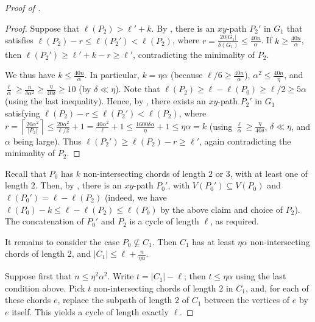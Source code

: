 \documentclass[11pt,english]{article}
\theoremstyle{plain}
\theoremstyle{definition}
\theoremstyle{remark}
\newcommand{\ceil}[1]{
	\left\lceil #1 \right\rceil
}
\begin{document}
\begin{proof}[Proof of ]
			\begin{proof}
				Suppose that $\ell(P_2) > \ell' + k$. 
				By , there is an $xy$-path $P_2'$ in $G_1$ that satisfies $\ell(P_2) - r \le \ell(P_2') < \ell(P_2)$, where $r = \frac{20|G_1|}{\delta(G_1)} \le \frac{40n}{\alpha}$. If $k \ge \frac{40n}{\alpha}$, then $\ell(P_2') \ge \ell' + k - r \ge \ell'$, contradicting the minimality of $P_2$. 

				We thus have $k \le \frac{40n}{\alpha}$. In particular, $k = \eta \alpha$ (because $\ell/6 \ge \frac{40n}{\alpha}$), $\alpha^2 \le \frac{40n}{\eta}$, and $\frac{\ell}{\alpha} \ge \frac{n}{\delta \alpha^2} \ge \frac{\eta}{40\delta} \ge 10$ (by $\delta \ll \eta$).
				Note that $\ell(P_2) \ge \ell - \ell(P_0) \ge \ell/2 \ge 5\alpha$ (using the last inequality). Hence, by , there exists an $xy$-path $P_2'$ in $G_1$ satisfying $\ell(P_2) - r \le \ell(P_2') < \ell(P_2)$, where $r = \ceil{\frac{20\alpha^2}{|P_2|}} \le \frac{20\alpha^2}{\ell/2} + 1 = \frac{40\alpha^2}{\ell} + 1 \le \frac{1600\delta \alpha}{\eta} + 1 \le \eta \alpha = k$ (using $\frac{\ell}{\alpha} \ge \frac{\eta}{40\delta}$, $\delta \ll \eta$, and $\alpha$ being large). Thus $\ell(P_2') \ge \ell(P_2) - r \ge \ell'$, again contradicting the minimality of $P_2$.
			\end{proof}

			Recall that $P_0$ has $k$ non-intersecting chords of length $2$ or $3$, with at least one of length $2$. Then, by , there is an $xy$-path $P_0'$, with $V(P_0') \subseteq V(P_0)$ and $\ell(P_0') = \ell - \ell(P_2)$ (indeed, we have $\ell(P_0) - k \le \ell - \ell(P_2) \le \ell(P_0)$ by the above claim and choice of $P_2$). The concatenation of $P_0'$ and $P_2$ is a cycle of length $\ell$, as required.

			It remains to consider the case $P_0 \not\subseteq C_1$. Then $C_1$ has at least $\eta\alpha$ non-intersecting chords of length $2$, and $|C_1| \le \ell + \frac{n}{\eta \alpha}$.

			Suppose first that $n \le \eta^2\alpha^2$. Write $t = |C_1| - \ell$; then $t \le \eta\alpha$ using the last condition above. Pick $t$ non-intersecting chords of length $2$ in $C_1$, and, for each of these chords $e$, replace the subpath of length $2$ of $C_1$ between the vertices of $e$ by $e$ itself. This yields a cycle of length exactly $\ell$.


\end{proof}
\end{document}
